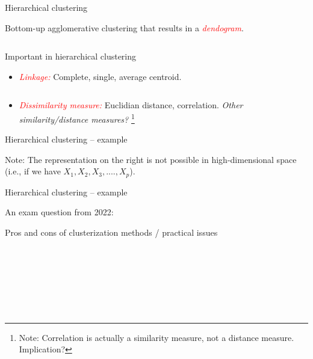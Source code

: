 \documentclass[
  10pt,
  ignorenonframetext,
]{beamer}
\providecommand{\tightlist}{%
  \setlength{\itemsep}{0pt}\setlength{\parskip}{0pt}}
\begin{document}
\begin{frame}
\begin{block}{Hierarchical clustering}
\protect\hypertarget{hierarchical-clustering}{}
\(~\)

Bottom-up agglomerative clustering that results in a
\emph{\textcolor{red}{dendogram}}.

\(~\)
\end{block}
\end{frame}

\begin{frame}
\begin{block}{Important in hierarchical clustering}
\protect\hypertarget{important-in-hierarchical-clustering}{}
\(~\)

\begin{itemize}
\tightlist
\item
  \emph{\textcolor{red}{Linkage:}} Complete, single, average centroid.
\end{itemize}

\(~\)

\begin{itemize}
\tightlist
\item
  \emph{\textcolor{red}{Dissimilarity measure:}} Euclidian distance,
  correlation. \emph{Other similarity/distance measures?}
  \footnote{ Note: Correlation is actually a similarity measure, not a distance measure. Implication?}
\end{itemize}
\end{block}
\end{frame}

\begin{frame}
\begin{block}{Hierarchical clustering -- example}
\protect\hypertarget{hierarchical-clustering-example}{}
\(~\)

Note: The representation on the right is not possible in
high-dimensional space (i.e., if we have \(X_1, X_2, X_3, ...., X_p\)).
\end{block}
\end{frame}

\begin{frame}
\begin{block}{Hierarchical clustering -- example}
\protect\hypertarget{hierarchical-clustering-example-1}{}
\(~\)

An exam question from 2022:
\end{block}
\end{frame}

\begin{frame}
\begin{block}{Pros and cons of clusterization methods / practical
issues}
\protect\hypertarget{pros-and-cons-of-clusterization-methods-practical-issues}{}
\(~\)

\(~\)

\(~\)

\(~\)

\(~\)

\(~\)

\(~\)

\(~\)

\(~\)

\(~\)
\end{block}
\end{frame}
\end{document}
